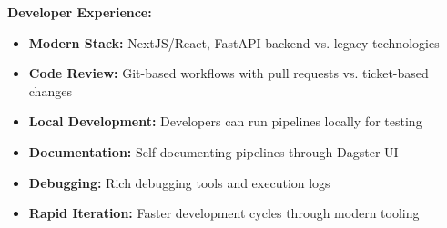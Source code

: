 \documentclass[10pt, a4paper]{article}
\begin{document}
{\vspace{0.15em}

\hspace{1em}\textbf{Developer Experience:}
\begin{itemize}[leftmargin=2.5em, itemsep=0.05em]
    \item \textbf{Modern Stack:} NextJS/React, FastAPI backend vs. legacy technologies
    \item \textbf{Code Review:} Git-based workflows with pull requests vs. ticket-based changes
    \item \textbf{Local Development:} Developers can run pipelines locally for testing
    \item \textbf{Documentation:} Self-documenting pipelines through Dagster UI
    \item \textbf{Debugging:} Rich debugging tools and execution logs
    \item \textbf{Rapid Iteration:} Faster development cycles through modern tooling
\end{itemize}
}
\end{document}
